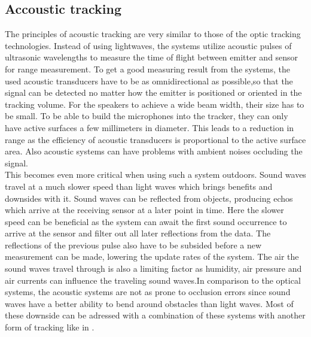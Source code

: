 \subsection{Accoustic tracking}
The principles of acoustic tracking are very similar to those of the optic tracking technologies. Instead of using lightwaves, the systems utilize acoustic pulses of ultrasonic wavelengths to measure the time of flight between emitter and sensor for range measurement. To get a good measuring result from the systems, the used acoustic transducers have to be as omnidirectional as possible,so that the signal can be detected no matter how the emitter is positioned or oriented in the tracking volume. For the speakers to achieve a wide beam width, their size has to be small.
To be able to build the microphones into the tracker, they can only have active surfaces a few millimeters in diameter. This leads to a reduction in range as the efficiency of acoustic transducers is proportional to the active surface area. Also acoustic systems can have problems with ambient noises occluding the signal. \\This becomes even more critical when using such a system outdoors. Sound waves travel at a much slower speed than light waves which brings benefits and downsides with it. Sound waves can be reflected from objects, producing echos which arrive at the receiving sensor at a later point in time. Here the slower speed can be beneficial as the system can await the first sound occurrence to arrive at the sensor and filter out all later reflections from the data. The reflections of the previous pulse also have to be subsided before a new measurement can be made, lowering the update rates of the system. The air the sound waves travel through is also a limiting factor as humidity, air pressure and air currents can influence the traveling sound waves.In comparison to the optical systems, the acoustic systems are not as prone to occlusion errors since sound waves have a better ability to bend around obstacles than light waves.
Most of these downside can be adressed with a combination of these systems with another form of tracking like in \cite{Foxlin.1998}.
